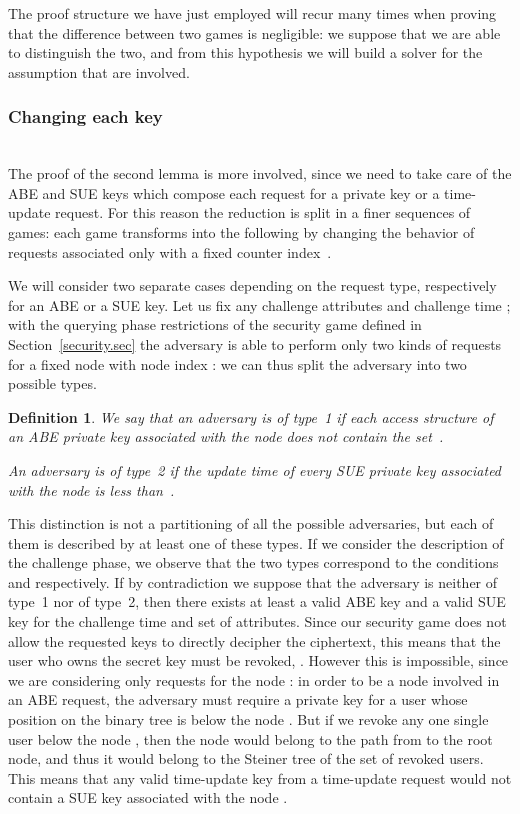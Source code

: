 \documentclass[a4paper,10pt]{article}
\newtheorem{definition}{Definition}
\newcommand{\typeone}{type~1}
\newcommand{\typetwo}{type~2}
\begin{document}
	The proof structure we have just employed will recur many times when proving that the difference between two games is negligible: we suppose that we are able to distinguish the two, and from this hypothesis we will build a solver for the assumption that are involved.
	
	\subsubsection{Changing each key}
\ \\
	The proof of the second lemma is more involved, since we need to take care of the ABE and SUE keys which compose each request for a private key or a time-update request.	
	For this reason the reduction is split in a finer sequences of games: each game transforms into the following by changing the behavior of requests associated only with a fixed counter index~.
	
	We will consider two separate cases depending on the request type, respectively for an ABE or a SUE key. Let us fix any challenge attributes  and challenge time ; with the querying phase restrictions of the security game defined in Section~\ref{security.sec} the adversary is able to perform only two kinds of requests for a fixed node  with node index : we can thus split the adversary into two possible types.
	\begin{definition}
		We say that an adversary  is of \emph{\typeone{}} if each access structure  of an ABE private key associated with the node  does not contain the set~.
		
		An adversary  is of \emph{\typetwo{}} if the update time  of every SUE private key associated with the node  is less than~.
	\end{definition}
	
	This distinction is not a partitioning of all the possible adversaries, but each of them is described by at least one of these types. If we consider the description of the challenge phase, we observe that the two types correspond to the conditions  and  respectively. If by contradiction we suppose that the adversary is neither of \typeone{} nor of \typetwo{}, then there exists at least a valid ABE key and a valid SUE key for the challenge time and set of attributes. Since our security game does not allow the requested keys to directly decipher the ciphertext, this means that the user who owns the secret key must be revoked, . However this is impossible, since we are considering only requests for the node : in order to be a node involved in an ABE request, the adversary must require a private key for a user whose position on the binary tree  is below the node . But if we revoke any one single user  below the node , then the node  would belong to the path from  to the root node, and thus it would belong to the Steiner tree of the set of revoked users. This means that any valid time-update key from a time-update request would not contain a SUE key associated with the node .
	
\end{document}
